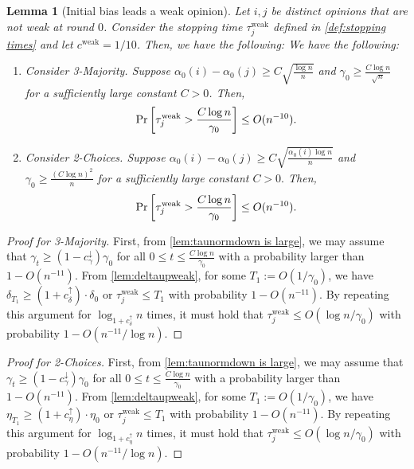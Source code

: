 \documentclass[letterpaper,11pt]{article}
\newtheorem{lemma}[theorem]{Lemma}
\newcommand{\alphanorm}{\gamma}
\newcommand{\cweak}{c^{\mathrm{weak}}}
\newcommand{\cnormdown}{c^{\downarrow}_\alphanorm}
\newcommand{\cdeltaup}{c^{\uparrow}_\delta}
\newcommand{\taujweak}{\tau^{\mathrm{weak}}_j}
\newcommand{\cetaup}{c^\uparrow_\eta}
\begin{document}
\begin{lemma}[Initial bias leads a weak opinion]
    \label{lem:initial bias weak}
    Let $ i,j $ be distinct opinions that are not weak at round $ 0 $.
    Consider the stopping time $\taujweak $ defined in \cref{def:stopping times} and let $\cweak=1/10$.
    Then, we have the following:
    We have the following:
\begin{enumerate}
  \renewcommand{\labelenumi}{(\roman{enumi})}
        \item 
        Consider 3-Majority. 
        Suppose $\alpha_0(i)- \alpha_0(j)\geq C\sqrt{\frac{\log n}{n}}$ and 
        $\alphanorm_0\geq \frac{C\log n}{\sqrt{n}}$ for a sufficiently large constant $C>0$.
        Then,
        \[
        \Pr\qty[\taujweak>\frac{C\log n}{\alphanorm_0}]\leq O(n^{-10}).
        \]
        \item 
        Consider 2-Choices. 
        Suppose $\alpha_0(i)- \alpha_0(j)\geq C\sqrt{\frac{\alpha_0(i)\log n}{n}}$ and 
        $\alphanorm_0\geq \frac{(C\log n)^2}{n}$ for a sufficiently large constant $C>0.$
        Then,
        \[
        \Pr\qty[\taujweak>\frac{C\log n}{\alphanorm_0}]\leq O(n^{-10}).
        \]
\end{enumerate}
\end{lemma}
\begin{proof}[Proof for 3-Majority]
  First, from \cref{lem:taunormdown is large}, we may assume that $ \alphanorm_t \ge (1-\cnormdown)\alphanorm_0 $ for all $ 0\le t \le \frac{C\log n}{\alphanorm_0} $ with a probability larger than $1-O(n^{-11})$. 
  From \cref{lem:deltaupweak}, for some $ T_1:=O(1/\alphanorm_0) $, we have $ \delta_{T_1} \ge (1+\cdeltaup)\cdot \delta_{0} $ or $ \taujweak \le T_1 $ with probability $ 1-O(n^{-11}) $.
  By repeating this argument for $ \log_{1+\cdeltaup} n $ times, it must hold that $ \taujweak \le O(\log n/\alphanorm_0) $ with probability $ 1-O(n^{-11}/\log n) $.
\end{proof}
\begin{proof}[Proof for 2-Choices]
  First, from \cref{lem:taunormdown is large}, we may assume that $ \alphanorm_t \ge (1-\cnormdown)\alphanorm_0 $ for all $ 0\le t \le \frac{C\log n}{\alphanorm_0} $ with a probability larger than $1-O(n^{-11})$. 
  From \cref{lem:deltaupweak}, for some $ T_1:=O(1/\alphanorm_0) $, we have $ \eta_{T_1} \ge (1+\cetaup)\cdot \eta_{0} $ or $ \taujweak \le T_1 $ with probability $ 1-O(n^{-11}) $.
  By repeating this argument for $ \log_{1+\cetaup} n $ times, it must hold that $ \taujweak \le O(\log n/\alphanorm_0) $ with probability $ 1-O(n^{-11}/\log n) $.
\end{proof}
\end{document}
